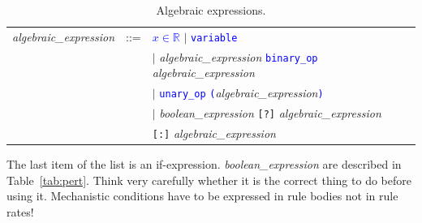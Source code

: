 \documentclass[11pt]{book}
\def\tcb#1{\textcolor{blue}{\ttt{#1}}}
\def\ttt#1{\texttt{#1}}
\def\Real{\mathbb R}
\begin{document}
\begin{table}[htbp]
  \centering
  \caption{Algebraic expressions.}
  \begin{tabular}{@{} lcl @{}}
    \textit{algebraic\_expression} & ::= & \tcb{$x\in\Real$} $\mid$ \tcb{variable} \\
     &  & $\mid$ \textit{algebraic\_expression} \tcb{binary\_op} \textit{algebraic\_expression}\\
     &  & $\mid$ \tcb{unary\_op} \tcb{(}\textit{algebraic\_expression}\tcb{)} \\
     &  & $\mid$ \textit{boolean\_expression}  \ttt{[?]} \textit{algebraic\_expression} \\
     & & \hspace*{2cm} \ttt{[:]} \textit{algebraic\_expression}\\
  \end{tabular}
  \label{tab:alg}
  \end{table}
The last item of the list is an
  if-expression. \textit{boolean\_expression} are described in
  Table~\ref{tab:pert}. Think very carefully whether it is the correct
  thing to do before using it. Mechanistic conditions have to be expressed in rule bodies not in rule rates!

\end{document}

